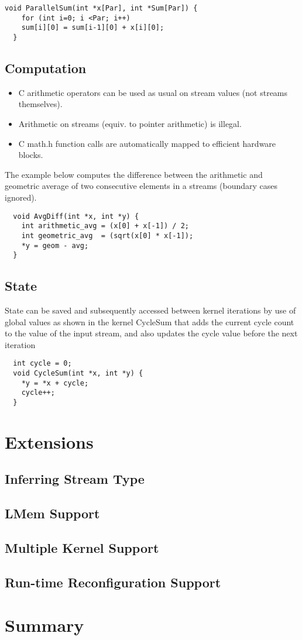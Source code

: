 \begin{lstlisting}[caption={Using loops for \FAST{} design parametrisation}]
  void ParallelSum(int *x[Par], int *Sum[Par]) {
    for (int i=0; i <Par; i++)
    sum[i][0] = sum[i-1][0] + x[i][0];
  }
\end{lstlisting}
\subsection{Computation}

\begin{itemize}

\item C arithmetic operators can be used as usual on stream values (not streams themselves).
\item Arithmetic on streams (equiv. to pointer arithmetic) is illegal.
\item C math.h function calls are automatically mapped to efficient hardware blocks.

\end{itemize}

The example below computes the difference between the arithmetic and geometric average of two consecutive elements in a streams (boundary cases ignored).


\begin{lstlisting}
  void AvgDiff(int *x, int *y) {
    int arithmetic_avg = (x[0] + x[-1]) / 2;
    int geometric_avg  = (sqrt(x[0] * x[-1]);
    *y = geom - avg;
  }
\end{lstlisting}

\subsection{State}
State can be saved and subsequently accessed between kernel iterations
by use of global values as shown in the kernel CycleSum that adds the
current cycle count to the value of the input stream, and also updates
the cycle value before the next iteration
\begin{lstlisting}
  int cycle = 0;
  void CycleSum(int *x, int *y) {
    *y = *x + cycle;
    cycle++;
  }
\end{lstlisting}
\section{Extensions}

\subsection{Inferring Stream Type}
\subsection{LMem Support}
\subsection{Multiple Kernel Support}
\subsection{Run-time Reconfiguration Support}

\section{Summary}

